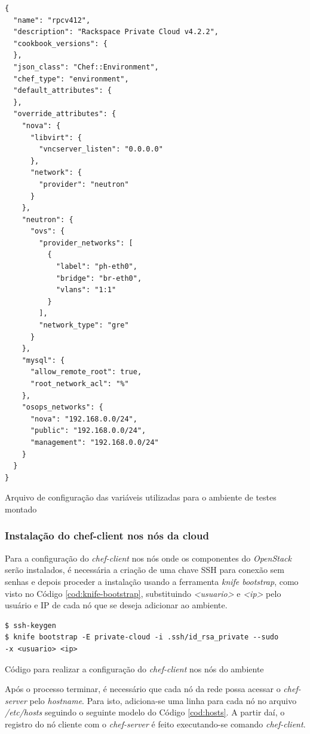 \begin{listing}
\begin{verbatim}
{
  "name": "rpcv412",
  "description": "Rackspace Private Cloud v4.2.2",
  "cookbook_versions": {
  },
  "json_class": "Chef::Environment",
  "chef_type": "environment",
  "default_attributes": {
  },
  "override_attributes": {
    "nova": {
      "libvirt": {
        "vncserver_listen": "0.0.0.0"
      },
      "network": {
        "provider": "neutron"
      }
    },
    "neutron": {
      "ovs": {
        "provider_networks": [
          {
            "label": "ph-eth0",
            "bridge": "br-eth0",
            "vlans": "1:1"
          }
        ],
        "network_type": "gre"
      }
    },
    "mysql": {
      "allow_remote_root": true,
      "root_network_acl": "%"
    },
    "osops_networks": {
      "nova": "192.168.0.0/24",
      "public": "192.168.0.0/24",
      "management": "192.168.0.0/24"
    }
  }
}
\end{verbatim}
\caption{Arquivo de configuração das variáveis utilizadas para o ambiente de testes
montado}
\label{cod:json}
\end{listing}

\subsubsection{Instalação do chef-client nos nós da cloud}

Para a configuração do \emph{chef-client} nos nós onde os componentes do \emph{OpenStack}
serão instalados, é necessária a criação de uma chave SSH para conexão sem senhas e depois
proceder a instalação usando a ferramenta \emph{knife bootstrap}, como visto no Código
\ref{cod:knife-bootstrap}, substituindo \emph{\textless usuario\textgreater} e
\emph{\textless ip\textgreater} pelo usuário e IP
de cada nó que se deseja adicionar ao ambiente.

\begin{listing}
\begin{verbatim}
$ ssh-keygen
$ knife bootstrap -E private-cloud -i .ssh/id_rsa_private --sudo
-x <usuario> <ip>
\end{verbatim}
\caption{Código para realizar a configuração do \emph{chef-client} nos nós do ambiente}
\label{cod:knife-bootstrap}
\end{listing}

Após o processo terminar, é necessário que cada nó da rede possa acessar o
\emph{chef-server} pelo \emph{hostname}. Para isto, adiciona-se uma linha
para cada nó no arquivo \emph{/etc/hosts} seguindo o seguinte modelo do Código
\ref{cod:hosts}. A partir daí, o registro do nó cliente com o \emph{chef-server} é feito
executando-se comando \emph{chef-client}.


